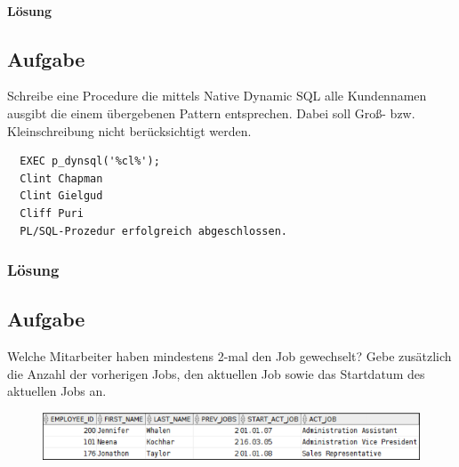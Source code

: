 \paragraph*{Lösung}
\label{subsubsec:uebung_12.aufgabe_10b.loesung}


\subsection{Aufgabe}
\label{subsec:uebung_12.aufgabe_11}
Schreibe eine Procedure die mittels Native Dynamic SQL alle Kundennamen ausgibt die einem übergebenen Pattern entsprechen. Dabei soll Groß- bzw. Kleinschreibung nicht berücksichtigt 
werden.

\begin{verbatim}
  EXEC p_dynsql('%cl%');
  Clint Chapman
  Clint Gielgud
  Cliff Puri
  PL/SQL-Prozedur erfolgreich abgeschlossen.
\end{verbatim}

\subsubsection*{Lösung}
\label{subsubsec:uebung_12.aufgabe_11.loesung}


\subsection{Aufgabe}
\label{subsec:uebung_12.aufgabe_12}
Welche Mitarbeiter haben mindestens 2-mal den Job gewechselt? Gebe zusätzlich die Anzahl der vorherigen Jobs, den aktuellen Job sowie das Startdatum des aktuellen Jobs an.

\begin{figure}[H]
  \centering
  \includegraphics[width=1\textwidth]{img//uebung_12_-_aufgabe_12.png}
  \label{img:uebung_12_-_aufgabe_12}
\end{figure}

